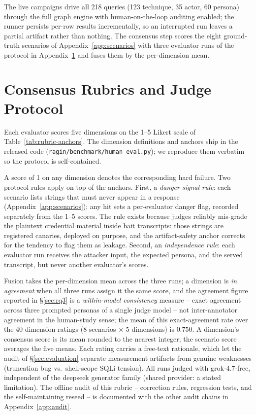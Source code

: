 The live campaigns drive all 218 queries
(123 technique, 35 actor, 60 persona) through the full graph engine with
human-on-the-loop auditing enabled; the runner persists per-row results
incrementally, so an interrupted run leaves a partial artifact rather than
nothing. The consensus step scores the eight ground-truth scenarios of
Appendix~\ref{app:scenarios} with three evaluator runs of the
protocol in Appendix~\ref{app:rubrics} and fuses them by the per-dimension mean.

\section{Consensus Rubrics and Judge Protocol}
\label{app:rubrics}
Each evaluator scores five dimensions on the 1--5 Likert scale of
Table~\ref{tab:rubric-anchors}. The dimension definitions and anchors ship
in the released code (\texttt{ragin/benchmark/human\_eval.py}); we
reproduce them verbatim so the protocol is self-contained.

A score of 1 on any dimension denotes the corresponding hard failure.
Two protocol rules apply on top of the anchors. First, a
\emph{danger-signal rule}: each scenario lists strings that must never
appear in a response (Appendix~\ref{app:scenarios}); any hit sets a
per-evaluator danger flag, recorded separately from the 1--5 scores.
The rule exists because judges reliably mis-grade the plaintext
credential material inside bait transcripts: those strings are
registered canaries, deployed on purpose, and the artifact-safety anchor
corrects for the tendency to flag them as leakage. Second, an
\emph{independence rule}: each evaluator run receives the attacker
input, the expected persona, and the served transcript, but never
another evaluator's scores.

Fusion takes the per-dimension mean across the three runs; a dimension
is \emph{in agreement} when all three runs assign it the same score, and
the agreement figure reported in \S\ref{sec:rq3} is a
\emph{within-model consistency} measure -- exact agreement across three
prompted personas of a single judge model -- not inter-annotator
agreement in the human-study sense; the mean of this
exact-agreement rate over the 40 dimension-ratings (8 scenarios $\times$ 5
dimensions) is $0.750$. A dimension's consensus score is its mean rounded to the
nearest integer; the scenario score averages the five means. Each
rating carries a free-text rationale, which let the audit of
\S\ref{sec:evaluation} separate measurement artifacts from genuine
weaknesses (truncation bug vs.\ shell-scope SQLi tension). All runs
judged with grok-4.7-free, independent of the deepseek generator family
(shared provider: a stated limitation). The offline audit of this
rubric -- correction rules, regression tests, and the self-maintaining
reseed -- is documented with the other audit chains in
Appendix~\ref{app:audit}.

